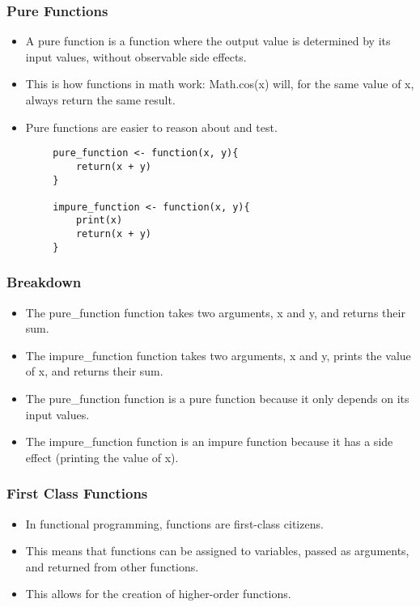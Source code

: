 \documentclass[serif, 9pt, aspectratio=32]{beamer}
\begin{document}
\begin{frame}
    \centering
    \frametitle{Pure Functions}
    \begin{itemize}
        \setlength{\itemsep}{2em}
        \item A pure function is a function where the output value is determined by its input values, without observable side effects.
        \item This is how functions in math work: Math.cos(x) will, for the same value of x, always return the same result.
        \item Pure functions are easier to reason about and test.
    \end{itemize}
\end{frame}

\begin{frame}[fragile]
    \begin{lstlisting}
        pure_function <- function(x, y){
            return(x + y)
        }

        impure_function <- function(x, y){
            print(x)
            return(x + y)
        }
    \end{lstlisting}
\end{frame}

\begin{frame}
    \centering
    \frametitle{Breakdown}
    \begin{itemize}
        \setlength{\itemsep}{2em}
        \item The pure\_function function takes two arguments, x and y, and returns their sum.
        \item The impure\_function function takes two arguments, x and y, prints the value of x, and returns their sum.
        \item The pure\_function function is a pure function because it only depends on its input values.
        \item The impure\_function function is an impure function because it has a side effect (printing the value of x).
    \end{itemize}
\end{frame}

\begin{frame}
    \centering
    \frametitle{First Class Functions}
    \begin{itemize}
        \setlength{\itemsep}{2em}
        \item In functional programming, functions are first-class citizens.
        \item This means that functions can be assigned to variables, passed as arguments, and returned from other functions.
        \item This allows for the creation of higher-order functions.
    \end{itemize}
\end{frame}
\end{document}
